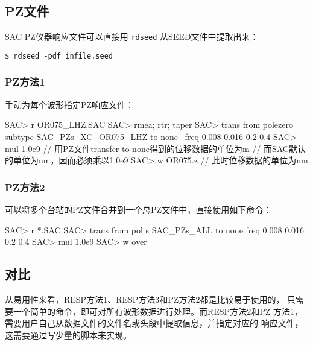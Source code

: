 \subsection{PZ文件}
SAC PZ仪器响应文件可以直接用 \texttt{rdseed} 从SEED文件中提取出来：
\begin{verbatim}
$ rdseed -pdf infile.seed
\end{verbatim}

\subsubsection{PZ方法1}
手动为每个波形指定PZ响应文件：
\begin{SACCode}
SAC> r OR075_LHZ.SAC
SAC> rmea; rtr; taper
SAC> trans from polezero subtype SAC_PZs_XC_OR075_LHZ to none \
                        freq 0.008 0.016 0.2 0.4
SAC> mul 1.0e9      // 用PZ文件transfer to none得到的位移数据的单位为m
                    // 而SAC默认的单位为nm，因而必须乘以1.0e9
SAC> w OR075.z      // 此时位移数据的单位为nm
\end{SACCode}

\subsubsection{PZ方法2}
可以将多个台站的PZ文件合并到一个总PZ文件中，直接使用如下命令：
\begin{SACCode}
SAC> r *.SAC
SAC> trans from pol s SAC_PZs_ALL to none freq 0.008 0.016 0.2 0.4
SAC> mul 1.0e9
SAC> w over
\end{SACCode}

\subsection{对比}
从易用性来看，RESP方法1、RESP方法3和PZ方法2都是比较易于使用的，
只需要一个简单的命令，即可对所有波形数据进行处理。而RESP方法2和PZ
方法1，需要用户自己从数据文件的文件名或头段中提取信息，并指定对应的
响应文件，这需要通过写少量的脚本来实现。

